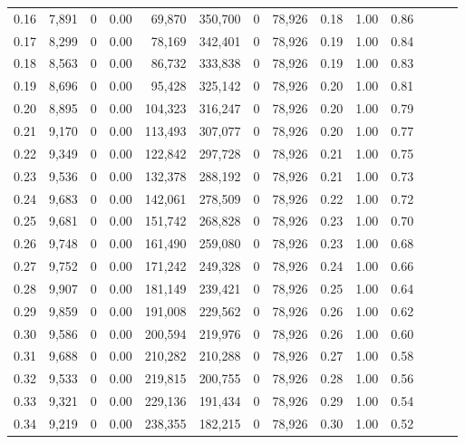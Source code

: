 \begin{tabular}{rrrrrrrrrrrrrr}
0.16 &  7,891 &      0 &  0.00 &   69,870 &  350,700 &       0 &  78,926 &  0.18 &  1.00 &      0.86 \\
0.17 &  8,299 &      0 &  0.00 &   78,169 &  342,401 &       0 &  78,926 &  0.19 &  1.00 &      0.84 \\
0.18 &  8,563 &      0 &  0.00 &   86,732 &  333,838 &       0 &  78,926 &  0.19 &  1.00 &      0.83 \\
0.19 &  8,696 &      0 &  0.00 &   95,428 &  325,142 &       0 &  78,926 &  0.20 &  1.00 &      0.81 \\
0.20 &  8,895 &      0 &  0.00 &  104,323 &  316,247 &       0 &  78,926 &  0.20 &  1.00 &      0.79 \\
0.21 &  9,170 &      0 &  0.00 &  113,493 &  307,077 &       0 &  78,926 &  0.20 &  1.00 &      0.77 \\
0.22 &  9,349 &      0 &  0.00 &  122,842 &  297,728 &       0 &  78,926 &  0.21 &  1.00 &      0.75 \\
0.23 &  9,536 &      0 &  0.00 &  132,378 &  288,192 &       0 &  78,926 &  0.21 &  1.00 &      0.73 \\
0.24 &  9,683 &      0 &  0.00 &  142,061 &  278,509 &       0 &  78,926 &  0.22 &  1.00 &      0.72 \\
0.25 &  9,681 &      0 &  0.00 &  151,742 &  268,828 &       0 &  78,926 &  0.23 &  1.00 &      0.70 \\
0.26 &  9,748 &      0 &  0.00 &  161,490 &  259,080 &       0 &  78,926 &  0.23 &  1.00 &      0.68 \\
0.27 &  9,752 &      0 &  0.00 &  171,242 &  249,328 &       0 &  78,926 &  0.24 &  1.00 &      0.66 \\
0.28 &  9,907 &      0 &  0.00 &  181,149 &  239,421 &       0 &  78,926 &  0.25 &  1.00 &      0.64 \\
0.29 &  9,859 &      0 &  0.00 &  191,008 &  229,562 &       0 &  78,926 &  0.26 &  1.00 &      0.62 \\
0.30 &  9,586 &      0 &  0.00 &  200,594 &  219,976 &       0 &  78,926 &  0.26 &  1.00 &      0.60 \\
0.31 &  9,688 &      0 &  0.00 &  210,282 &  210,288 &       0 &  78,926 &  0.27 &  1.00 &      0.58 \\
0.32 &  9,533 &      0 &  0.00 &  219,815 &  200,755 &       0 &  78,926 &  0.28 &  1.00 &      0.56 \\
0.33 &  9,321 &      0 &  0.00 &  229,136 &  191,434 &       0 &  78,926 &  0.29 &  1.00 &      0.54 \\
0.34 &  9,219 &      0 &  0.00 &  238,355 &  182,215 &       0 &  78,926 &  0.30 &  1.00 &      0.52 \\

\end{tabular}
